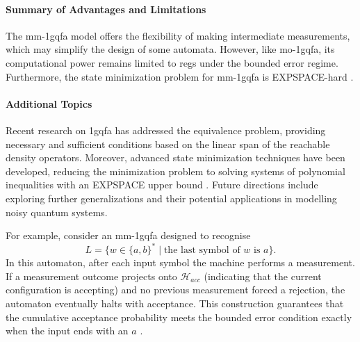 \paragraph{Summary of Advantages and Limitations} 
The \gls{mm-1gqfa} model offers the flexibility of making intermediate measurements, which may simplify the design of some automata. However, like \gls{mo-1gqfa}, its computational power remains limited to \glspl{reg} under the bounded error regime. Furthermore, the state minimization problem for \gls{mm-1gqfa} is EXPSPACE-hard \cite{mateus2012complexity}.

\paragraph{Additional Topics}  
Recent research on \gls{1gqfa} has addressed the equivalence problem, providing necessary and sufficient conditions based on the linear span of the reachable density operators. Moreover, advanced state minimization techniques have been developed, reducing the minimization problem to solving systems of polynomial inequalities with an EXPSPACE upper bound \cite{mercer2008lower}. Future directions include exploring further generalizations and their potential applications in modelling noisy quantum systems.

\begin{example} 
For example, consider an \gls{mm-1gqfa} designed to recognise 
\[
L=\{w\in\{a,b\}^* \mid \text{the last symbol of }w\text{ is }a\}.
\]
In this automaton, after each input symbol the machine performs a measurement. If a measurement outcome projects onto $\mathcal{H}_{acc}$ (indicating that the current configuration is accepting) and no previous measurement forced a rejection, the automaton eventually halts with acceptance. This construction guarantees that the cumulative acceptance probability meets the bounded error condition exactly when the input ends with an $a$ \cite{li2012characterizations}.
\end{example}